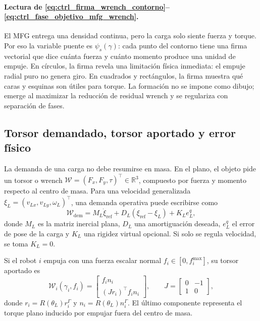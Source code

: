 \paragraph{Lectura de \eqref{eq:ctrl_firma_wrench_contorno}--\eqref{eq:ctrl_fase_objetivo_mfg_wrench}.}
El MFG entrega una densidad continua, pero la carga solo siente fuerza y torque. Por eso
la variable puente es $\psi_s(\gamma)$: cada punto del contorno tiene una firma vectorial
que dice cuánta fuerza y cuánto momento produce una unidad de empuje. En círculos, la
firma revela una limitación física inmediata: el empuje radial puro no genera giro. En
cuadrados y rectángulos, la firma muestra qué caras y esquinas son útiles para torque. La
formación no se impone como dibujo; emerge al maximizar la reducción de residual wrench y
se regulariza con separación de fases.

\subsection{Torsor demandado, torsor aportado y error físico}
\label{subsec:control-torsor}

La demanda de una carga no debe resumirse en masa. En el plano, el objeto pide un torsor
o wrench
\(
  \mathcal W=(F_x,F_y,\tau)^\top\in\mathbb R^3
\),
compuesto por fuerza y momento respecto al centro de masa. Para una velocidad
generalizada $\xi_L=(v_{Lx},v_{Ly},\omega_L)^\top$, una demanda operativa puede escribirse
como
\begin{equation}
  \mathcal W_{\mathrm{dem}}
  =
  M_L\dot\xi_{\mathrm{ref}}
  +
  D_L(\xi_{\mathrm{ref}}-\xi_L)
  +
  K_L e_L^q ,
  \label{eq:ctrl_torsor_demanda}
\end{equation}
donde $M_L$ es la matriz inercial plana, $D_L$ una amortiguación deseada, $e_L^q$ el error
de pose de la carga y $K_L$ una rigidez virtual opcional. Si solo se regula velocidad,
se toma $K_L=0$.

Si el robot $i$ empuja con una fuerza escalar normal $f_i\in[0,f_i^{\max}]$, su torsor
aportado es
\begin{equation}
  \mathcal W_i(\gamma_i,f_i)
  =
  \begin{bmatrix}
    f_i n_i\\
    (Jr_i)^\top f_i n_i
  \end{bmatrix},
  \qquad
  J=
  \begin{bmatrix}
    0 & -1\\
    1 & 0
  \end{bmatrix},
  \label{eq:ctrl_torsor_robot}
\end{equation}
donde $r_i=R(\theta_L)r_i^\Gamma$ y $n_i=R(\theta_L)n_i^\Gamma$. El último componente
representa el torque plano inducido por empujar fuera del centro de masa.

